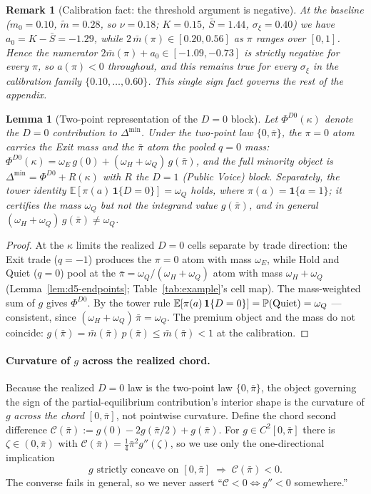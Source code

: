 \documentclass[11pt]{article}
\newtheorem{lemma}{Lemma}
\newcommand{\E}{\mathbb{E}}
\newcommand{\PP}{\mathbb{P}}
\newcommand{\1}{\mathbf{1}}
\newtheorem{remark}{Remark}
\begin{document}
\begin{remark}[Calibration fact: the threshold argument is negative]\label{rem:d5-anegative}
At the baseline ($m_0=0.10$, $\tilde m=0.28$, so $\nu=0.18$; $K=0.15$, $\bar S=1.44$, $\sigma_\xi=0.40$) we have $a_0=K-\bar S=-1.29$, while $2\,\bar m(\pi)\in[0.20,0.56]$ as $\pi$ ranges over $[0,1]$. Hence the numerator $2\bar m(\pi)+a_0\in[-1.09,-0.73]$ is \emph{strictly negative for every $\pi$}, so $a(\pi)<0$ throughout, and this remains true for every $\sigma_\xi$ in the calibration family $\{0.10,\dots,0.60\}$. This single sign fact governs the rest of the appendix.
\end{remark}

\begin{lemma}[Two-point representation of the $D=0$ block]\label{lem:d5-twopoint}
Let $\Phi^{D0}(\kappa)$ denote the $D=0$ contribution to $\Delta^{\min}$. Under the two-point law $\{0,\bar\pi\}$, the $\pi=0$ atom carries the \emph{Exit} mass and the $\bar\pi$ atom the pooled $q=0$ mass: $\Phi^{D0}(\kappa)=\omega_E\,g(0)+(\omega_H+\omega_Q)\,g(\bar\pi)$, and the full minority object is $\Delta^{\min}=\Phi^{D0}+R(\kappa)$ with $R$ the $D=1$ (Public Voice) block. Separately, the tower identity $\E[\pi(a)\,\1\{D=0\}]=\omega_Q$ holds, where $\pi(a)=\1\{a=1\}$; it certifies the \emph{mass} $\omega_Q$ but not the integrand value $g(\bar\pi)$, and in general $(\omega_H+\omega_Q)\,g(\bar\pi)\neq\omega_Q$.
\end{lemma}
\begin{proof}
At the $\kappa$ limits the realized $D=0$ cells separate by trade direction: the Exit trade ($q=-1$) produces the $\pi=0$ atom with mass $\omega_E$, while Hold and Quiet ($q=0$) pool at the $\bar\pi=\omega_Q/(\omega_H+\omega_Q)$ atom with mass $\omega_H+\omega_Q$ (Lemma~\ref{lem:d5-endpoints}; Table~\ref{tab:example}'s cell map). The mass-weighted sum of $g$ gives $\Phi^{D0}$. By the tower rule $\E[\pi(a)\,\1\{D=0\}]=\PP(\textup{Quiet})=\omega_Q$ --- consistent, since $(\omega_H+\omega_Q)\,\bar\pi=\omega_Q$. The premium object and the mass do not coincide: $g(\bar\pi)=\bar m(\bar\pi)\,p(\bar\pi)\le\bar m(\bar\pi)<1$ at the calibration.
\end{proof}

\paragraph{Curvature of $g$ across the realized chord.}
Because the realized $D=0$ law is the two-point law $\{0,\bar\pi\}$, the object governing the sign of the partial-equilibrium contribution's interior shape is the curvature of $g$ \emph{across the chord} $[0,\bar\pi]$, not pointwise curvature. Define the chord second difference $\mathcal C(\bar\pi):=g(0)-2g(\bar\pi/2)+g(\bar\pi)$. For $g\in C^2[0,\bar\pi]$ there is $\zeta\in(0,\bar\pi)$ with $\mathcal C(\bar\pi)=\tfrac14\bar\pi^{2}g''(\zeta)$, so we use only the one-directional implication
\begin{equation}\label{eq:d5-secant-onedir}
  g\text{ strictly concave on }[0,\bar\pi]\;\Longrightarrow\;\mathcal C(\bar\pi)<0 .
\end{equation}
The converse fails in general, so we never assert ``$\mathcal C<0\iff g''<0$ somewhere.''
\end{document}
